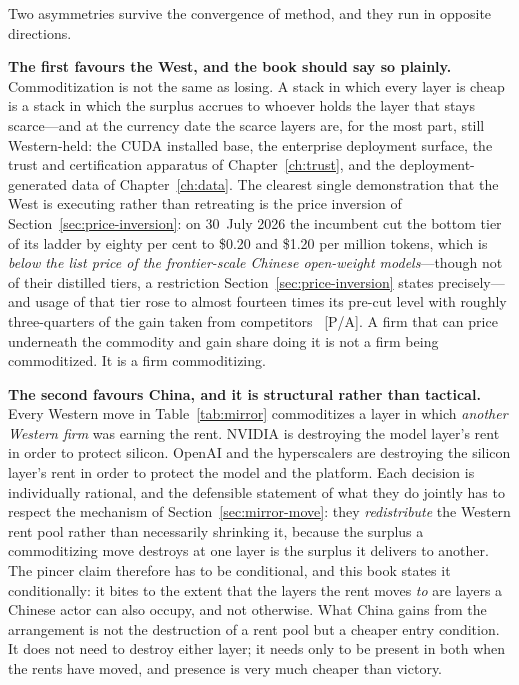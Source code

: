 Two asymmetries survive the convergence of method, and they run in opposite directions.

\textbf{The first favours the West, and the book should say so plainly.} Commoditization is not the same as losing. A stack in which every layer is cheap is a stack in which the surplus accrues to whoever holds the layer that stays scarce---and at the currency date the scarce layers are, for the most part, still Western-held: the CUDA installed base, the enterprise deployment surface, the trust and certification apparatus of Chapter~\ref{ch:trust}, and the deployment-generated data of Chapter~\ref{ch:data}. The clearest single demonstration that the West is executing rather than retreating is the price inversion of Section~\ref{sec:price-inversion}: on 30~July 2026 the incumbent cut the bottom tier of its ladder by eighty per cent to \$0.20 and \$1.20 per million tokens, which is \emph{below the list price of the frontier-scale Chinese open-weight models}---though not of their distilled tiers, a restriction Section~\ref{sec:price-inversion} states precisely---and usage of that tier rose to almost fourteen times its pre-cut level with roughly three-quarters of the gain taken from competitors~\cite{openai-luna,price-inversion} [P/A]. A firm that can price underneath the commodity and gain share doing it is not a firm being commoditized. It is a firm commoditizing.

\textbf{The second favours China, and it is structural rather than tactical.} Every Western move in Table~\ref{tab:mirror} commoditizes a layer in which \emph{another Western firm} was earning the rent. NVIDIA is destroying the model layer's rent in order to protect silicon. OpenAI and the hyperscalers are destroying the silicon layer's rent in order to protect the model and the platform. Each decision is individually rational, and the defensible statement of what they do jointly has to respect the mechanism of Section~\ref{sec:mirror-move}: they \emph{redistribute} the Western rent pool rather than necessarily shrinking it, because the surplus a commoditizing move destroys at one layer is the surplus it delivers to another. The pincer claim therefore has to be conditional, and this book states it conditionally: it bites to the extent that the layers the rent moves \emph{to} are layers a Chinese actor can also occupy, and not otherwise. What China gains from the arrangement is not the destruction of a rent pool but a cheaper entry condition. It does not need to destroy either layer; it needs only to be present in both when the rents have moved, and presence is very much cheaper than victory.

